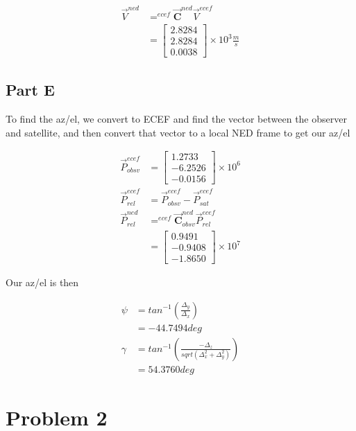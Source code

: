 \documentclass[]{article}
\begin{document}
\begin{align*}
	\overrightarrow{V}^{ned} &= ^{ecef}\overrightarrow{\mathbf{C}}^{ned} \overrightarrow{V}^{ecef} \\
	&= \begin{bmatrix}
	2.8284 \\
	2.8284 \\
	0.0038
	\end{bmatrix} \times 10^3 \frac{m}{s}
\end{align*}

\subsection{Part E}

To find the az/el, we convert to ECEF and find the vector between the observer and satellite, and then convert that vector to a local NED frame to get our az/el

\begin{align*}
	\overrightarrow{P}^{ecef}_{obsv} &= \begin{bmatrix}
	1.2733 \\ -6.2526 \\-0.0156
	\end{bmatrix} \times 10^6 \\
	\overrightarrow{P}^{ecef}_{rel} &= \overrightarrow{P}^{ecef}_{obsv} - \overrightarrow{P}^{ecef}_{sat} \\
	\overrightarrow{P}^{ned}_{rel} &= ^{ecef}\overrightarrow{\mathbf{C}}^{ned}_{obsv} \overrightarrow{P}^{ecef}_{rel} \\
	&= \begin{bmatrix}
	0.9491 \\
	-0.9408 \\
	-1.8650
	\end{bmatrix} \times 10^7
\end{align*}

Our az/el is then

\begin{align*}
	\psi &= tan^{-1}(\frac{\Delta_y}{\Delta_x}) \\
	&= -44.7494deg \\
	\gamma &= tan^{-1}( \frac{-\Delta_z}{sqrt( \Delta_x^2 + \Delta_y^2 )} ) \\
	&= 54.3760deg
\end{align*}

\section{Problem 2}
\end{document}
